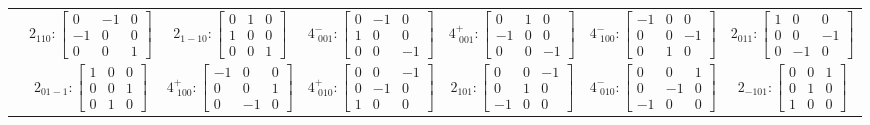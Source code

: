 \documentclass[fleqn,8pt,landscape]{jsarticle}
\begin{document}
\begin{longtable}{ccccccc}
& $ 2{}_{110}:\begin{bmatrix} 0 & -1 & 0 \\ -1 & 0 & 0 \\ 0 & 0 & 1 \end{bmatrix} $ & $ 2{}_{1-10}:\begin{bmatrix} 0 & 1 & 0 \\ 1 & 0 & 0 \\ 0 & 0 & 1 \end{bmatrix} $ & $ 4^{-}_{\,\,001}:\begin{bmatrix} 0 & -1 & 0 \\ 1 & 0 & 0 \\ 0 & 0 & -1 \end{bmatrix} $ & $ 4^{+}_{\,\,001}:\begin{bmatrix} 0 & 1 & 0 \\ -1 & 0 & 0 \\ 0 & 0 & -1 \end{bmatrix} $ & $ 4^{-}_{\,\,100}:\begin{bmatrix} -1 & 0 & 0 \\ 0 & 0 & -1 \\ 0 & 1 & 0 \end{bmatrix} $ & $ 2{}_{011}:\begin{bmatrix} 1 & 0 & 0 \\ 0 & 0 & -1 \\ 0 & -1 & 0 \end{bmatrix} $ \\
& $ 2{}_{01-1}:\begin{bmatrix} 1 & 0 & 0 \\ 0 & 0 & 1 \\ 0 & 1 & 0 \end{bmatrix} $ & $ 4^{+}_{\,\,100}:\begin{bmatrix} -1 & 0 & 0 \\ 0 & 0 & 1 \\ 0 & -1 & 0 \end{bmatrix} $ & $ 4^{+}_{\,\,010}:\begin{bmatrix} 0 & 0 & -1 \\ 0 & -1 & 0 \\ 1 & 0 & 0 \end{bmatrix} $ & $ 2{}_{101}:\begin{bmatrix} 0 & 0 & -1 \\ 0 & 1 & 0 \\ -1 & 0 & 0 \end{bmatrix} $ & $ 4^{-}_{\,\,010}:\begin{bmatrix} 0 & 0 & 1 \\ 0 & -1 & 0 \\ -1 & 0 & 0 \end{bmatrix} $ & $ 2{}_{-101}:\begin{bmatrix} 0 & 0 & 1 \\ 0 & 1 & 0 \\ 1 & 0 & 0 \end{bmatrix} $ \\

\end{longtable}
\end{document}
